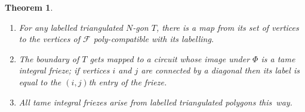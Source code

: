 \documentclass[12pt]{article}
\newtheorem{theorem}{Theorem}
\theoremstyle{definition}
\newcommand{\F}{\mathscr{F}}
\begin{document}
\begin{theorem}
\label{thm:poly:model}
\begin{enumerate}[label=(\roman*)]
\item \label{it:compat}
For any labelled triangulated $N$-gon $T$, there is a map from its set of vertices to the vertices of $\F$ poly-compatible with its labelling. 
\item \label{it:frieze}
The boundary of $T$ gets mapped to a circuit whose image under $\Phi$ is a tame integral frieze; if vertices $i$ and $j$ are connected by a diagonal then its label is equal to the $(i,j)$th entry of the frieze.
\item \label{it:surj}
All tame integral friezes arise from labelled triangulated polygons this~way.
\end{enumerate}
\end{theorem}
\end{document}
